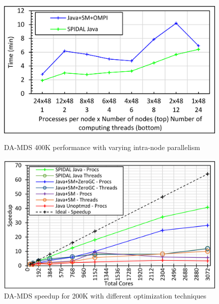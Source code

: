 \begin{figure}[!htb]   
	\centering 
	\begin{minipage}{0.49\textwidth}
        \centering
        \includegraphics[width=0.85\columnwidth]{figures/fig_400K_TP}
        \caption{DA-MDS 400K performance with varying intra-node parallelism}
        \label{fig:fig_400K_TP}
    \end{minipage}
    \begin{minipage}{0.49\textwidth}
        \centering
        \includegraphics[width=0.85\columnwidth]{figures/fig_speedup_with_opts}
		\caption{DA-MDS speedup for 200K with different optimization techniques}
		\label{fig:fig_speedup_with_opts}
    \end{minipage}            
\end{figure}

